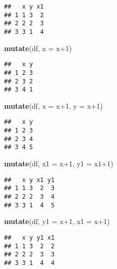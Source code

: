 \documentclass[]{book}
\newenvironment{Shaded}{\begin{snugshade}}{\end{snugshade}}
\newcommand{\KeywordTok}[1]{\textcolor[rgb]{0.13,0.29,0.53}{\textbf{{#1}}}}
\newcommand{\DataTypeTok}[1]{\textcolor[rgb]{0.13,0.29,0.53}{{#1}}}
\newcommand{\DecValTok}[1]{\textcolor[rgb]{0.00,0.00,0.81}{{#1}}}
\newcommand{\NormalTok}[1]{{#1}}
\begin{document}
\begin{verbatim}
##   x y x1
## 1 1 3  2
## 2 2 2  3
## 3 3 1  4
\end{verbatim}

\begin{Shaded}
\begin{Highlighting}[]
\KeywordTok{mutate}\NormalTok{(df, }\DataTypeTok{x =} \NormalTok{x}\DecValTok{+1}\NormalTok{)}
\end{Highlighting}
\end{Shaded}

\begin{verbatim}
##   x y
## 1 2 3
## 2 3 2
## 3 4 1
\end{verbatim}

\begin{Shaded}
\begin{Highlighting}[]
\KeywordTok{mutate}\NormalTok{(df, }\DataTypeTok{x =} \NormalTok{x}\DecValTok{+1}\NormalTok{, }\DataTypeTok{y =} \NormalTok{x}\DecValTok{+1}\NormalTok{)}
\end{Highlighting}
\end{Shaded}

\begin{verbatim}
##   x y
## 1 2 3
## 2 3 4
## 3 4 5
\end{verbatim}

\begin{Shaded}
\begin{Highlighting}[]
\KeywordTok{mutate}\NormalTok{(df, }\DataTypeTok{x1 =} \NormalTok{x}\DecValTok{+1}\NormalTok{, }\DataTypeTok{y1 =} \NormalTok{x1}\DecValTok{+1}\NormalTok{)}
\end{Highlighting}
\end{Shaded}

\begin{verbatim}
##   x y x1 y1
## 1 1 3  2  3
## 2 2 2  3  4
## 3 3 1  4  5
\end{verbatim}

\begin{Shaded}
\begin{Highlighting}[]
\KeywordTok{mutate}\NormalTok{(df, }\DataTypeTok{y1 =} \NormalTok{x}\DecValTok{+1}\NormalTok{, }\DataTypeTok{x1 =} \NormalTok{x}\DecValTok{+1}\NormalTok{)}
\end{Highlighting}
\end{Shaded}

\begin{verbatim}
##   x y y1 x1
## 1 1 3  2  2
## 2 2 2  3  3
## 3 3 1  4  4
\end{verbatim}
\end{document}
